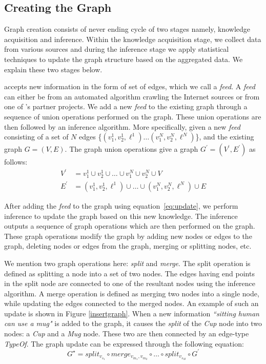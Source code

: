 \subsection{Creating the Graph}
Graph creation consists of never ending cycle of two stages namely, knowledge acquisition and inference. Within the knowledge acquisition stage, we collect data from various sources and during the inference stage we apply statistical techniques to update the graph structure based on the aggregated data. We explain these two stages below.



\smallskip
{} \robobrain{} accepts new information in the form of set of edges, which we call a \textit{feed}. A \textit{feed} can either be from an automated algorithm crawling the Internet sources or from one of \robobrain{}'s partner projects.
We add a new \textit{feed} to the existing graph through a sequence of union operations performed on the  graph. These union operations are then followed by an inference algorithm.
More specifically, given a new \emph{feed} consisting of a set of $N$ edges \{$(v^1_1,v^1_2,\ell^1) \ldots (v^N_1,v^N_2,\ell^N)$\}, and the existing graph $G = (V,E)$. The graph union operations give a graph $G^\prime=(V^\prime,E^\prime)$ as follows:
\begin{equation}
\label{eq:update}
\begin{aligned}
V^\prime &= v^1_1 \cup v^1_2 \cup \ldots \cup v^N_1 \cup v^N_2 \cup V \\
E^\prime &=  (v^1_1,v^1_2,\ell^1) \cup \ldots \cup (v^N_1,v^N_2,\ell^N) \cup E
\end{aligned}
\end{equation}


\smallskip
{}
After adding the \textit{feed} to the graph using equation~\eqref{eq:update}, we perform inference to update the graph based on this new knowledge. The inference outputs a sequence of graph operations which are then performed on the graph. These graph operations modify the graph by adding new nodes or edges to the graph, deleting nodes or edges from the graph, merging or splitting nodes, etc.

We mention two graph operations here: \emph{split} and \emph{merge}. The split operation is defined as splitting a node into a set of two nodes. The edges having end points in the split node are connected to one of the resultant nodes using the inference algorithm. A merge operation is defined as merging two nodes into a single node, while updating the edges connected to the merged nodes. An example of such an update is shown in Figure \ref{insertgraph}. When a new information \emph{``sitting human can use a mug"} is added to the graph, it causes the \textit{split} of the \emph{Cup} node into two nodes: a \emph{Cup} and a \emph{Mug} node. These two are then connected by an edge-type \textit{TypeOf}. The graph update can be expressed through the following equation:
$$G^\star = split_{v_{s_1}} \circ merge_{v_{m_1},v_{m_2}} \circ \ldots \circ split_{v_{s_M}} \circ G^\prime$$

